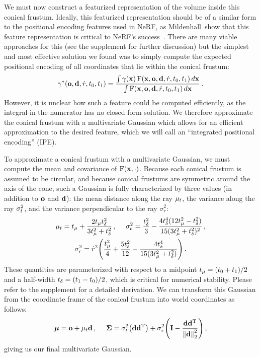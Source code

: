 \documentclass[10pt,twocolumn,letterpaper]{article}
\begin{document}
We must now construct a featurized representation of the volume inside this conical frustum. Ideally, this featurized representation should be of a similar form to the positional encoding features used in NeRF, as Mildenhall~\etal show that this feature representation is critical to NeRF's success~\cite{mildenhall2020}.
There are many viable approaches for this (see the supplement for further discussion) but the simplest and most effective solution we found was to simply compute the expected positional encoding of all coordinates that lie within the conical frustum:
\begin{equation}
    \gamma^*(\mathbf{o}, \mathbf{d}, \dot r, t_0, t_1)= \frac{\int \gamma(\mathbf{x}) \operatorname{F}(\mathbf{x}, \mathbf{o}, \mathbf{d}, \dot r, t_0, t_1)\, d \mathbf{x}}{\int \operatorname{F}(\mathbf{x}, \mathbf{o}, \mathbf{d}, \dot r, t_0, t_1)\, d \mathbf{x}}\,.
\end{equation}
However, it is unclear how such a feature could be computed efficiently, as the integral in the numerator has no closed form solution. We therefore approximate the conical frustum with a multivariate Gaussian which allows for an efficient approximation to the desired feature, which we will call an ``integrated positional encoding'' (IPE).

To approximate a conical frustum with a multivariate Gaussian, we must compute the mean and covariance of $\operatorname{F}(\mathbf{x}, \cdot)$. Because each conical frustum is assumed to be circular, and because conical frustums are symmetric around the axis of the cone, such a Gaussian is fully characterized by three values (in addition to $\mathbf{o}$ and $\mathbf{d}$): the mean distance along the ray $\mu_t$, the variance along the ray $\sigma_t^2$, and the variance perpendicular to the ray $\sigma_{r}^2$:
\begin{gather}
    \mu_\zval = \zc + \frac{2 \zc \zd^2}{3 \zc^2 + \zd^2}\,,  \quad\,\,
    \sigma_\zval^2 = \frac{\zd^2}{3} -\frac{4 \zd^4 (12 \zc^2 - \zd^2)}{15 (3 \zc^2 + \zd^2)^2}\,, \nonumber \\
    \sigma_{r}^2 = \baseradius^2 \left( \frac{\zc^2}{4} + \frac{5 \zd^2}{12} - \frac{4 \zd^4}{15 
                              (3 \zc^2 + \zd^2)} \right) \,.
\end{gather}
These quantities are parameterized with respect to a midpoint $t_\mu = (t_0 + t_1) / 2$ and a half-width $t_\delta = (t_1 - t_0) / 2$, which is critical for numerical stability. Please refer to the supplement for a detailed derivation. We can transform this Gaussian from the coordinate frame of the conical frustum into world coordinates as follows:
\begin{equation}
\boldsymbol{\mu} = \rayorigin + \mu_\zval \raydir\,, \quad\,\,
\covmat = \sigma_\zval^2 \left(\raydir\raydir^\transpose\right) + \sigma_{r}^2 \left(\mathbf{I} - \frac{\raydir\raydir^\transpose}{\norm{\raydir}_2^2} \right)\,,
\end{equation}
giving us our final multivariate Gaussian.
\end{document}
